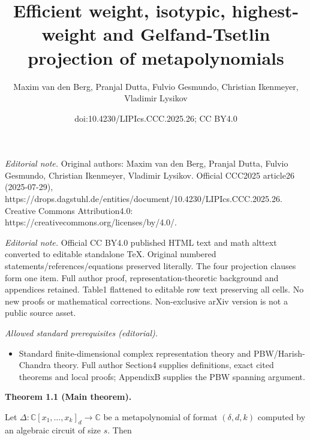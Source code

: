 \documentclass[10pt,a4paper]{article}
\title{Efficient weight, isotypic, highest-weight and Gelfand-Tsetlin projection of metapolynomials}
\author{Maxim van den Berg, Pranjal Dutta, Fulvio Gesmundo, Christian Ikenmeyer, Vladimir Lysikov}
\date{doi:10.4230/LIPIcs.CCC.2025.26; CC BY4.0}
\begin{document}
\maketitle
\noindent\textit{Editorial note.} Original authors: Maxim van den Berg, Pranjal Dutta, Fulvio Gesmundo, Christian Ikenmeyer, Vladimir Lysikov. Official CCC2025 article26 (2025-07-29), https://drops.dagstuhl.de/entities/document/10.4230/LIPIcs.CCC.2025.26. Creative Commons Attribution4.0: https://creativecommons.org/licenses/by/4.0/.\par\medskip
\noindent\textit{Editorial note.} Official CC BY4.0 published HTML text and math alttext converted to editable standalone TeX. Original numbered statements/references/equations preserved literally. The four projection clauses form one item. Full author proof, representation-theoretic background and appendices retained. Table1 flattened to editable row text preserving all cells. No new proofs or mathematical corrections. Non-exclusive arXiv version is not a public source asset.\par\medskip
\noindent\textit{Allowed standard prerequisites (editorial).}\begin{itemize}
\item Standard finite-dimensional complex representation theory and PBW/Harish-Chandra theory. Full author Section4 supplies definitions, exact cited theorems and local proofs; AppendixB supplies the PBW spanning argument.
\end{itemize}\medskip


\par\medskip\noindent\textbf{Theorem 1.1 (Main theorem).}\par



Let $\Delta\colon\mathbb{C}[x_{1},\dots,x_{k}]_{d}\to\mathbb{C}$ be a metapolynomial of format $(\delta,d,k)$ computed by an algebraic circuit of size $s$.
Then
\end{document}
